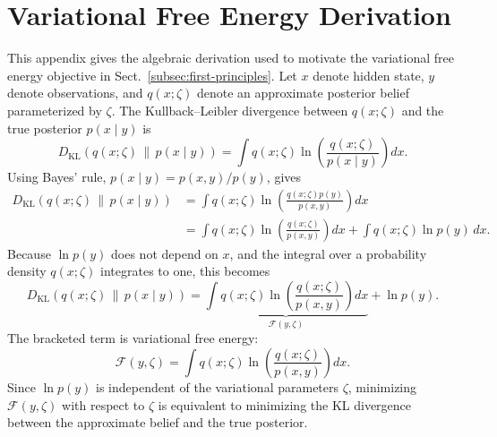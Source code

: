 \appendix
\section{Variational Free Energy Derivation}
\label{app:vfe-derivation}

This appendix gives the algebraic derivation used to motivate the variational free energy objective in Sect.~\ref{subsec:first-principles}. Let $x$ denote hidden state, $y$ denote observations, and $q(x;\zeta)$ denote an approximate posterior belief parameterized by $\zeta$. The Kullback--Leibler divergence between $q(x;\zeta)$ and the true posterior $p(x\mid y)$ is
\begin{equation}
    D_{\mathrm{KL}}
    \left(
        q(x;\zeta) \,\|\, p(x\mid y)
    \right)
    =
    \int q(x;\zeta)
    \ln
    \left(
        \frac{q(x;\zeta)}{p(x\mid y)}
    \right) dx .
    \label{eq:appendix-kl-posterior}
\end{equation}
Using Bayes' rule, $p(x\mid y)=p(x,y)/p(y)$, gives
\begin{align}
    D_{\mathrm{KL}}
    \left(
        q(x;\zeta) \,\|\, p(x\mid y)
    \right)
    &=
    \int q(x;\zeta)
    \ln
    \left(
        \frac{q(x;\zeta)p(y)}{p(x,y)}
    \right) dx
    \nonumber \\
    &=
    \int q(x;\zeta)
    \ln
    \left(
        \frac{q(x;\zeta)}{p(x,y)}
    \right) dx
    +
    \int q(x;\zeta)\ln p(y)\,dx .
    \label{eq:appendix-kl-expanded}
\end{align}
Because $\ln p(y)$ does not depend on $x$, and the integral over a probability density $q(x;\zeta)$ integrates to one, this becomes
\begin{equation}
    D_{\mathrm{KL}}
    \left(
        q(x;\zeta) \,\|\, p(x\mid y)
    \right)
    =
    \underbrace{
    \int q(x;\zeta)
    \ln
    \left(
        \frac{q(x;\zeta)}{p(x,y)}
    \right) dx
    }_{\mathcal{F}(y,\zeta)}
    +
    \ln p(y).
    \label{eq:appendix-vfe-definition}
\end{equation}
The bracketed term is variational free energy:
\begin{equation}
    \mathcal{F}(y,\zeta)
    =
    \int q(x;\zeta)
    \ln
    \left(
        \frac{q(x;\zeta)}{p(x,y)}
    \right) dx .
    \label{eq:appendix-vfe}
\end{equation}
Since $\ln p(y)$ is independent of the variational parameters $\zeta$, minimizing $\mathcal{F}(y,\zeta)$ with respect to $\zeta$ is equivalent to minimizing the KL divergence between the approximate belief and the true posterior.

